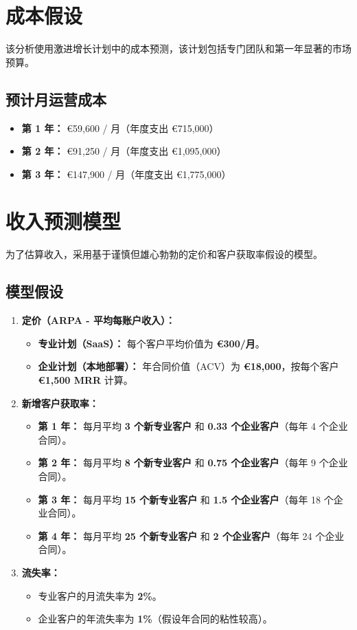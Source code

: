 \documentclass[11pt, a4paper, oneside]{article}
\begin{document}
\section{成本假设}
该分析使用激进增长计划中的成本预测，该计划包括专门团队和第一年显著的市场预算。

\subsection*{预计月运营成本}
\begin{itemize}
  \item \textbf{第 1 年：} €59,600 / 月（年度支出 €715,000）
  \item \textbf{第 2 年：} €91,250 / 月（年度支出 €1,095,000）
  \item \textbf{第 3 年：} €147,900 / 月（年度支出 €1,775,000）
\end{itemize}

\section{收入预测模型}
为了估算收入，采用基于谨慎但雄心勃勃的定价和客户获取率假设的模型。

\subsection{模型假设}
\begin{enumerate}
    \item \textbf{定价（ARPA - 平均每账户收入）：}
    \begin{itemize}
        \item \textbf{专业计划（SaaS）：} 每个客户平均价值为 \textbf{€300/月}。
        \item \textbf{企业计划（本地部署）：} 年合同价值（ACV）为 \textbf{€18,000}，按每个客户 \textbf{€1,500 MRR} 计算。
    \end{itemize}

    \item \textbf{新增客户获取率：}
    \begin{itemize}
        \item \textbf{第 1 年：} 每月平均 \textbf{3 个新专业客户} 和 \textbf{0.33 个企业客户}（每年 4 个企业合同）。
        \item \textbf{第 2 年：} 每月平均 \textbf{8 个新专业客户} 和 \textbf{0.75 个企业客户}（每年 9 个企业合同）。
        \item \textbf{第 3 年：} 每月平均 \textbf{15 个新专业客户} 和 \textbf{1.5 个企业客户}（每年 18 个企业合同）。
        \item \textbf{第 4 年：} 每月平均 \textbf{25 个新专业客户} 和 \textbf{2 个企业客户}（每年 24 个企业合同）。
    \end{itemize}

    \item \textbf{流失率：}
    \begin{itemize}
        \item 专业客户的月流失率为 \textbf{2\%}。
        \item 企业客户的年流失率为 \textbf{1\%}（假设年合同的粘性较高）。
    \end{itemize}
\end{enumerate}
\end{document}
